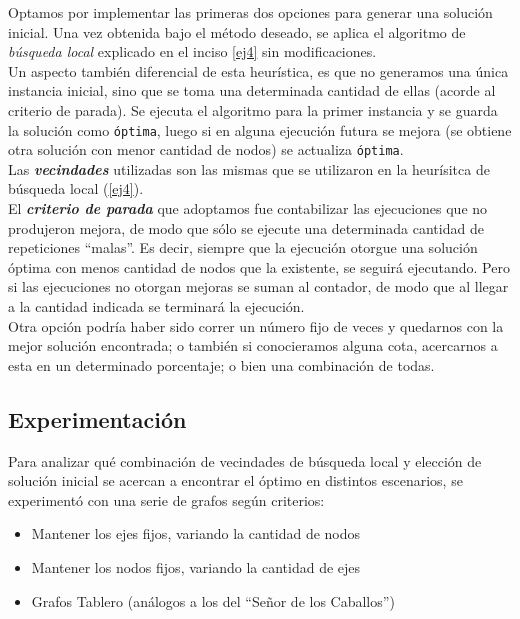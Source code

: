 Optamos por implementar las primeras dos opciones para generar una solución inicial. Una vez obtenida bajo el método deseado, se aplica el algoritmo de \emph{b\'usqueda local} explicado en el inciso \ref{ej4} sin modificaciones.\\

Un aspecto tambi\'en diferencial de esta heur\'istica, es que no generamos una \'unica instancia inicial, sino que se toma una determinada cantidad de ellas (acorde al criterio de parada). Se ejecuta el algoritmo para la primer instancia y se guarda la solución como \texttt{\'optima}, luego si en alguna ejecución futura se mejora (se obtiene otra solución con menor cantidad de nodos) se actualiza \texttt{\'optima}.\\

Las \emph{\textbf{vecindades}} utilizadas son las mismas que se utilizaron en la heur\'isitca de b\'usqueda local (\ref{ej4}).\\

El \emph{\textbf{criterio de parada}} que adoptamos fue contabilizar las ejecuciones que no produjeron mejora, de modo que sólo se ejecute una determinada cantidad de repeticiones ``malas''. Es decir, siempre que la ejecución otorgue una solución óptima con menos cantidad de nodos que la existente, se seguirá ejecutando. Pero si las ejecuciones no otorgan mejoras se suman al contador, de modo que al llegar a la cantidad indicada se terminará la ejecución.\\

Otra opci\'on podr\'ia haber sido correr un n\'umero fijo de veces y quedarnos con la mejor soluci\'on encontrada; o tambi\'en si conocieramos alguna cota, acercarnos a esta en un determinado porcentaje; o bien una combinaci\'on de todas.

\newpage
\subsection{Experimentaci\'on}

Para analizar qu\'e combinaci\'on de vecindades de b\'usqueda local y elecci\'on de soluci\'on inicial se acercan a encontrar el \'optimo en distintos escenarios, se experiment\'o con una serie de grafos seg\'un criterios:
\begin{itemize}
	\item Mantener los ejes fijos, variando la cantidad de nodos
	\item Mantener los nodos fijos, variando la cantidad de ejes
	\item Grafos Tablero (an\'alogos a los del ``Se\~nor de los Caballos'')
\end{itemize}

